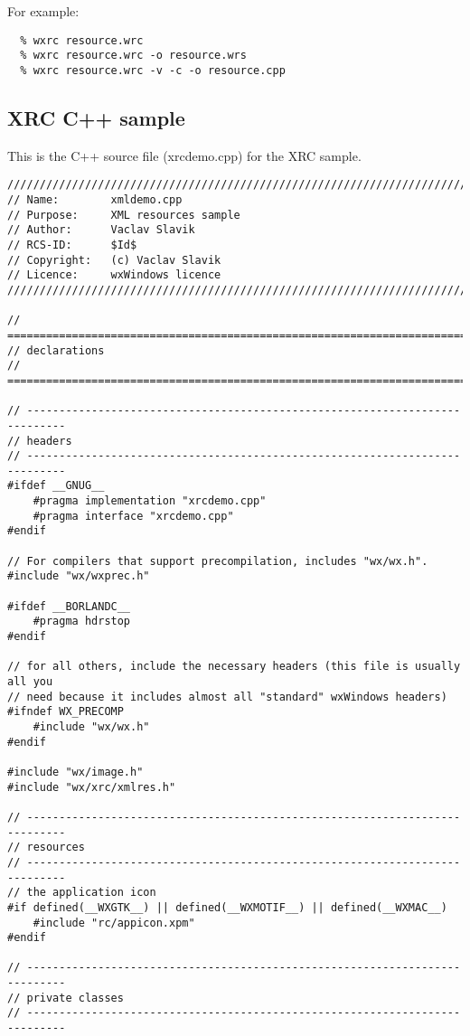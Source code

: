 For example:

\begin{verbatim}
  % wxrc resource.wrc
  % wxrc resource.wrc -o resource.wrs
  % wxrc resource.wrc -v -c -o resource.cpp
\end{verbatim}

\subsection{XRC C++ sample}\label{xrccppsample}

This is the C++ source file (xrcdemo.cpp) for the XRC sample.

\begin{verbatim}
/////////////////////////////////////////////////////////////////////////////
// Name:        xmldemo.cpp
// Purpose:     XML resources sample
// Author:      Vaclav Slavik
// RCS-ID:      $Id$
// Copyright:   (c) Vaclav Slavik
// Licence:     wxWindows licence
/////////////////////////////////////////////////////////////////////////////

// ============================================================================
// declarations
// ============================================================================

// ----------------------------------------------------------------------------
// headers
// ----------------------------------------------------------------------------
#ifdef __GNUG__
    #pragma implementation "xrcdemo.cpp"
    #pragma interface "xrcdemo.cpp"
#endif

// For compilers that support precompilation, includes "wx/wx.h".
#include "wx/wxprec.h"

#ifdef __BORLANDC__
    #pragma hdrstop
#endif

// for all others, include the necessary headers (this file is usually all you
// need because it includes almost all "standard" wxWindows headers)
#ifndef WX_PRECOMP
    #include "wx/wx.h"
#endif

#include "wx/image.h"
#include "wx/xrc/xmlres.h"

// ----------------------------------------------------------------------------
// resources
// ----------------------------------------------------------------------------
// the application icon
#if defined(__WXGTK__) || defined(__WXMOTIF__) || defined(__WXMAC__)
    #include "rc/appicon.xpm"
#endif

// ----------------------------------------------------------------------------
// private classes
// ----------------------------------------------------------------------------


\end{verbatim}
